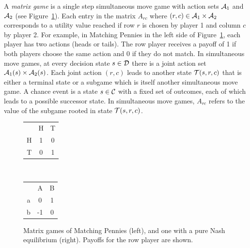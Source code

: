 A {\it matrix game} is a single step simultaneous move game with action sets $\mathcal{A}_1$ and $\mathcal{A}_2$ (see Figure~\ref{fig:egMatrixGames}).
Each entry in the matrix $A_{rc}$ where $(r,c) \in \mathcal{A}_1 \times \mathcal{A}_2$ corresponds to a utility value reached if row $r$ is chosen by player 1 and column $c$ by player 2.
For example, in Matching Pennies in the left side of Figure~\ref{fig:egMatrixGames}, each player has two actions (heads or tails).
The row player receives a payoff of 1
if both players choose the same action and 0 if they do not match.
In simultaneous move games, at every decision state $s \in \mathcal{D}$ there is a joint action set $\mathcal{A}_1(s) \times \mathcal{A}_2(s)$.
Each joint action $(r,c)$ leads to another state $\mathcal{T}(s,r,c)$ that is either a terminal state or a subgame which is itself another simultaneous move game.
A chance event is a state $s \in \mathcal{C}$ with a fixed set of outcomes, each of which leads to a possible successor state.
In simultaneous move games, $A_{rc}$ refers to the value of the subgame rooted in state $\mathcal{T}(s,r,c)$.

\begin{figure}[t!]
\centering
\begin{tabular}{c|c|c|}
 \multicolumn{1}{c}{~} & \multicolumn{1}{c}{H}  &  \multicolumn{1}{c}{T}\\\cline{2-3}
H &  1  &  0\\\cline{2-3}
T  & 0  &  1\\\cline{2-3}
\end{tabular}
~~~~~~~~~
\begin{tabular}{c|c|c|}
 \multicolumn{1}{c}{~} & \multicolumn{1}{c}{A}  &  \multicolumn{1}{c}{B}\\\cline{2-3}
a &  0  &  1\\\cline{2-3}
b & -1  &  0\\\cline{2-3}
\end{tabular}
\caption{Matrix games of Matching Pennies (left), and one with a pure Nash equilibrium (right).
Payoffs for the row player are shown. \label{fig:egMatrixGames}}
\end{figure}


